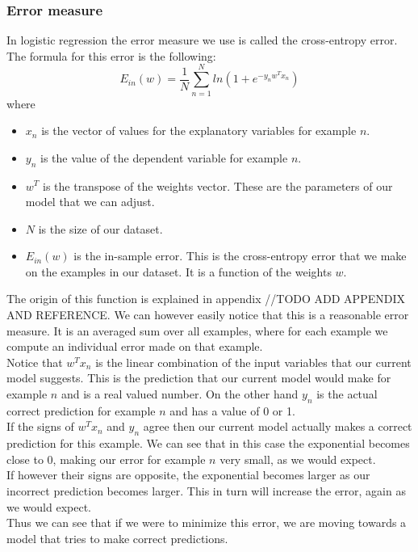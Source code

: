 \subsubsection{Error measure}
In logistic regression the error measure we use is called the cross-entropy error. The formula for this error is the following:
$$
	E_{in}(w) = \frac{1}{N}\sum_{n=1}^{N}ln(1+e^{-y_{n}w^{T}x_{n}})
$$
where
\begin{itemize}
	\item $x_{n}$ is the vector of values for the explanatory variables for example $n$.
	\item $y_{n}$ is the value of the dependent variable for example $n$.
	\item $w^T$ is the transpose of the weights vector. These are the parameters of our model that we can adjust.
	\item $N$ is the size of our dataset.
	\item $E_{in}(w)$ is the in-sample error. This is the cross-entropy error that we make on the examples in our dataset. It is a function of the weights $w$.
\end{itemize}
The origin of this function is explained in appendix //TODO ADD APPENDIX AND REFERENCE. We can however easily notice that this is a reasonable error measure. It is an averaged sum over all examples, where for each example we compute an individual error made on that example. \\
Notice that $w^{T}x_{n}$ is the linear combination of the input variables that our current model suggests. This is the prediction that our current model would make for example $n$ and is a real valued number. On the other hand $y_{n}$ is the actual correct prediction for example $n$ and has a value of 0 or 1.\\
If the signs of $w^{T}x_{n}$ and $y_{n}$ agree then our current model actually makes a correct prediction for this example. We can see that in this case the exponential becomes close to 0, making our error for example $n$ very small, as we would expect. \\
If however their signs are opposite, the exponential becomes larger as our incorrect prediction becomes larger. This in turn will increase the error, again as we would expect.\\
Thus we can see that if we were to minimize this error, we are moving towards a model that tries to make correct predictions.
